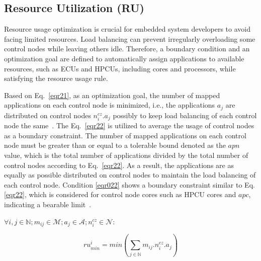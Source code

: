     
    
    
    
    
    \subsection{Resource Utilization (RU)}
    
    Resource usage optimization is crucial for embedded system developers to avoid facing limited resources. Load balancing can prevent irregularly overloading some control nodes while leaving others idle. Therefore, a boundary condition and an optimization goal are defined to automatically assign applications to available resources, such as ECUs and HPCUs, including cores and processors, while satisfying the resource usage rule. 

    Based on Eq.~\eqref{eqr21}, as an optimization goal, the number of mapped applications on each control node is minimized, i.e., the applications $a_j$ are distributed on control nodes $n_i^{cz}.a_j$ possibly to keep load balancing of each control node the same~\cite{askaripoor2023designer}. %
    The Eq.~\eqref{eqr22} is utilized to average the usage of control nodes as a boundary constraint. The number of mapped applications on each control node must be greater than or equal to a tolerable bound denoted as the $apn$ value, which is the total number of applications divided by the total number of control nodes according to Eq.~\eqref{eqr22}. As a result, the applications are as equally as possible distributed on control nodes to maintain the load balancing of each control node. Condition \eqref{eqr022} shows a boundary constraint similar to Eq. \eqref{eqr22}, which is considered for control node cores such as HPCU cores and $apc$, indicating a bearable limit~\cite{askaripoor2023designer}.\newline
    
    
    $\forall i,j \in \mathbb{N}; m_{ij} \in\mathcal{M}; a_j \in\mathcal{A}; {n_{i}^{cz}} \in \mathcal{N}$: 
     
    \begin{equation}
    	ru^{i}_{min} = min (\sum_{j \in \mathbb{N}} {m_{ij}}.{n_i^{cz}}.a_j) 
    	\label{eqr21}
    \end{equation}
    
